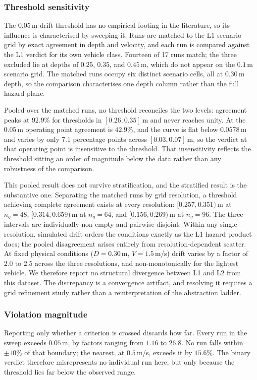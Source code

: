 \subsubsection{Threshold sensitivity}
The $0.05$\,m drift threshold has no empirical footing in the literature, so its
influence is characterised by sweeping it. Runs are matched to the L1 scenario grid by
exact agreement in depth and velocity, and each run is compared against the L1 verdict
for its own vehicle class. Fourteen of 17 runs match; the three excluded lie at depths
of $0.25$, $0.35$, and $0.45$\,m, which do not appear on the $0.1$\,m scenario grid.
The matched runs occupy six distinct scenario cells, all at $0.30$\,m depth, so the
comparison characterises one depth column rather than the full hazard plane.

Pooled over the matched runs, no threshold reconciles the two levels: agreement peaks
at $92.9\%$ for thresholds in $[0.26, 0.35]$\,m and never reaches unity. At the
$0.05$\,m operating point agreement is $42.9\%$, and the curve is flat below
$0.0578$\,m and varies by only $7.1$ percentage points across $[0.03, 0.07]$\,m, so the
verdict at that operating point is insensitive to the threshold. That insensitivity
reflects the threshold sitting an order of magnitude below the data rather than any
robustness of the comparison.

This pooled result does not survive stratification, and the stratified result is the
substantive one. Separating the matched runs by grid resolution, a threshold achieving
complete agreement exists at every resolution: $[0.257, 0.351)$\,m at $n_g=48$,
$[0.314, 0.659)$\,m at $n_g=64$, and $[0.156, 0.269)$\,m at $n_g=96$. The three
intervals are individually non-empty and pairwise disjoint. Within any single
resolution, simulated drift orders the conditions exactly as the L1 hazard product
does; the pooled disagreement arises entirely from resolution-dependent scatter. At
fixed physical conditions ($D=0.30$\,m, $V=1.5$\,m/s) drift varies by a factor of
$2.0$ to $2.5$ across the three resolutions, and non-monotonically for the lightest
vehicle. We therefore report no structural divergence between L1 and L2 from this
dataset. The discrepancy is a convergence artifact, and resolving it requires a grid
refinement study rather than a reinterpretation of the abstraction ladder.

\subsubsection{Violation magnitude}
Reporting only whether a criterion is crossed discards how far. Every run in the sweep
exceeds $0.05$\,m, by factors ranging from $1.16$ to $26.8$. No run falls within
$\pm10\%$ of that boundary; the nearest, at $0.5$\,m/s, exceeds it by $15.6\%$. The
binary verdict therefore misrepresents no individual run here, but only because the
threshold lies far below the observed range.

